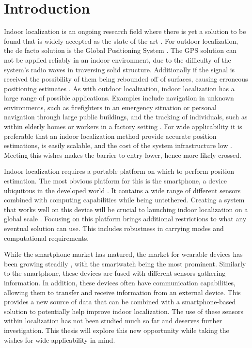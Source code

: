 
\chapter{Introduction} \label{chap:intro}

Indoor localization is an ongoing research field where there is yet a solution to be found that is widely accepted as the state of the art \cite{Davidson2017}. For outdoor localization, the de facto solution is the Global Positioning System \cite{Jackermeier2018}. The GPS solution can not be applied reliably in an indoor environment, due to the difficulty of the system's radio waves in traversing solid structure. Additionally if the signal is received the possibility of them being rebounded off of surfaces, causing erroneous positioning estimates \cite{Jackermeier2018}. As with outdoor localization, indoor localization has a large range of possible applications. Examples include navigation in unknown environments, such as firefighters in an emergency situation or personal navigation through large public buildings, and the tracking of individuals, such as within elderly homes or workers in a factory setting \cite{Correa2017}. For wide applicability it is preferable that an indoor localization method provide accurate position estimations, is easily scalable, and the cost of the
system infrastructure low \cite{Correa2017}. Meeting this wishes makes the barrier to entry lower, hence more likely crossed. \par 
Indoor localization requires a portable platform on which to perform position estimation. The most obvious platform for this is the smartphone, a device ubiquitous in the developed world \cite{Correa2017}. It contains a wide range of different sensors combined with computing capabilities while being untethered. Creating a system that works well on this device will be crucial to launching indoor localization on a global scale \cite{Gu2019}. Focusing on this platform brings additional restrictions to what any eventual solution can use. This includes robustness in carrying modes and computational requirements. \par 
While the smartphone market has matured, the market for wearable devices has been growing steadily \cite{jung2016consumer}, with the smartwatch being the most prominent. Similarly to the smartphone, these devices are fused with different sensors gathering information. In addition, these devices often have communication capabilities, allowing them to transfer and receive information from an external device. This provides a new source of data that can be combined with a smartphone-based solution to potentially help improve indoor localization. The use of these sensors within localization has not been studied much so far and deserves further investigation. This thesis will explore this new opportunity while taking the wishes for wide applicability in mind.
